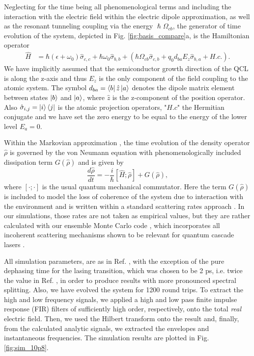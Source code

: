 \documentclass[]{spie}  %
\def\h{\hat}
\def\h{\hat}
\begin{document}
Neglecting for the time being all phenomenological terms and including the interaction with the electric field within the electric dipole approximation, as well as the resonant tunneling coupling via the energy $\hslash\Omega_{cb}$, the generator of time evolution of the system, depicted in Fig. \ref{fig:basis_compare}a, is the Hamiltonian operator
\begin{align}
\label{eq:hamiltonian-operatorform}
\h{H} &= \hbar(\epsilon+\omega_0)  \h\sigma_{c,c} +\hbar\omega_0 \h\sigma_{b,b} + (\hbar\Omega_{cb}\h\sigma_{c,b} + q_0d_{ba}E_z \h\sigma_{b,a}+H.c.).
\end{align}
 We have implicitly assumed that the semiconductor growth direction of the QCL is along the z-axis and thus $E_z$ is the only component of the field coupling to the atomic system. The symbol $d_{ba} = \bra{b}\h{z}\ket{a} $ denotes the dipole matrix element between states $\ket{b}$ and $\ket{a}$, where $\h{z}$ is the z-component of the position operator. Also $\h \sigma_{i,j} =\ket{i}\bra{j}$ is the atomic projection operators, "$H.c$" the Hermitian conjugate and we have set the zero energy to be equal to the energy of the lower level $E_a = 0$.

Within the Markovian approximation \cite{knezevic2013time}, the time evolution of the density operator $\h{\rho}$ is governed by the von Neumann equation with phenomenologically included dissipation term $G(\h{\rho})$ and is given by
\begin{equation}
\label{eq:vonNeumann}
\frac{d \h\rho}{dt} = -\frac{i}{\hbar}[\h H;\h\rho] + G(\h{\rho}),
\end{equation}
where $[\cdot;\cdot]$ is the usual quantum mechanical commutator. Here the term $G(\h{\rho})$ is included to model the loss of coherence of the system due to interaction with the environment and is written within a standard scattering rates approach \cite{iotti2005microscopic}. In our simulations, those rates are not taken as empirical values, but they are rather calculated with our ensemble Monte Carlo code \cite{jirauschek2014modeling}, which incorporates all incoherent scattering mechanisms shown to be relevant for quantum cascade lasers \cite{jirauschek2009monte,jirauschek2010monte,jirauschek2010monte_2}. 

All simulation parameters, are as in Ref. , with the exception of the pure dephasing time for the lasing transition, which was chosen to be 2 ps, i.e. twice the value in Ref. , in order to produce results with more pronounced spectral splitting. Also, we have evolved the system for 1200 round trips. To extract the high and low frequency signals, we applied a high and low pass finite impulse response (FIR) filters of sufficiently high order, respectively, onto the total \emph{real} electric field. Then, we used the Hilbert transform onto the result and, finally, from the calculated analytic signals, we extracted the envelopes and instantaneous frequencies. The simulation results are plotted in Fig. \ref{fig:sim_10p8}.
\end{document}
